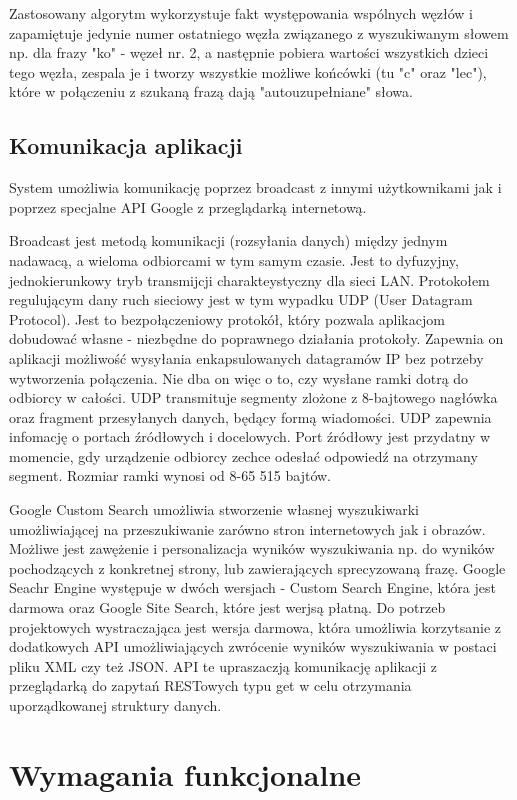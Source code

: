 \documentclass[twoside,a4paper]{book}
\begin{document}
Zastosowany algorytm wykorzystuje fakt występowania wspólnych węzłów i zapamiętuje jedynie numer ostatniego węzła związanego z wyszukiwanym słowem np. dla frazy "ko" - węzeł nr. 2, a następnie pobiera wartości wszystkich dzieci tego węzła, zespala je i tworzy wszystkie możliwe końcówki (tu "c" oraz "lec"), które w połączeniu z szukaną frazą dają "autouzupełniane" słowa.
\subsection{Komunikacja aplikacji}
System umożliwia komunikację poprzez broadcast z innymi użytkownikami jak i poprzez specjalne API Google z przeglądarką internetową. 

Broadcast jest metodą komunikacji (rozsyłania danych) między jednym nadawacą, a wieloma odbiorcami w tym samym czasie. Jest to dyfuzyjny, jednokierunkowy tryb  transmijcji charakteystyczny dla sieci LAN. Protokołem regulującym dany ruch sieciowy jest w tym wypadku UDP (User Datagram Protocol). Jest to bezpołączeniowy protokół, który pozwala aplikacjom dobudować własne - niezbędne do poprawnego działania protokoły. 
Zapewnia on aplikacji możliwość wysyłania enkapsulowanych datagramów IP bez potrzeby wytworzenia połączenia. Nie dba on więc o to, czy wysłane ramki dotrą do odbiorcy w całości.
UDP transmituje segmenty zlożone z 8-bajtowego nagłówka oraz fragment przesyłanych danych, będący formą wiadomości. 
UDP zapewnia infomację o portach źródłowych i docelowych. 
Port źródłowy jest przydatny w momencie, gdy urządzenie odbiorcy zechce odesłać odpowiedź na otrzymany segment.
Rozmiar ramki wynosi od 8-65 515 bajtów. ~\cite{UDP}

Google Custom Search umożliwia stworzenie własnej wyszukiwarki umożliwiającej na przeszukiwanie zarówno stron internetowych jak i obrazów. Możliwe jest zawężenie i personalizacja wyników wyszukiwania np. do wyników pochodzących z konkretnej strony, lub zawierających sprecyzowaną frazę.  Google Seachr Engine występuje w dwóch wersjach - Custom Search Engine, która jest darmowa oraz Google Site Search, które jest werjsą płatną. Do potrzeb projektowych wystraczająca jest wersja darmowa, która umożliwia korzytsanie z dodatkowych API umożliwiających zwrócenie wyników wyszukiwania w postaci pliku XML czy też JSON. API te upraszaczją komunikację aplikacji z przeglądarką do zapytań RESTowych typu get w celu otrzymania uporządkowanej struktury danych. ~\cite{googleAPI}


 
\section{Wymagania funkcjonalne}
\end{document}
